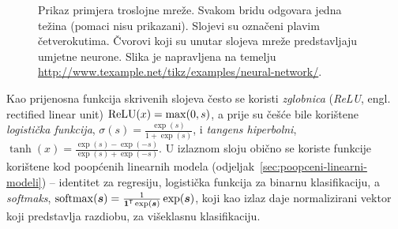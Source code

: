 \documentclass[utf8, diplomski, lmodern]{fer}
\begin{document}
\begin{figure}
\centering
{}
\caption{Prikaz primjera troslojne mreže. Svakom bridu odgovara jedna težina (pomaci nisu prikazani). Slojevi su označeni plavim četverokutima. Čvorovi koji su unutar slojeva mreže predstavljaju umjetne neurone. Slika je napravljena na temelju \url{http://www.texample.net/tikz/examples/neural-network/}.}
\label{fig:neuronska-mreza}
\end{figure}


Kao prijenosna funkcija skrivenih slojeva često se koristi \emph{zglobnica} (\emph{ReLU}, engl. rectified linear unit) $\operatorname{ReLU}(x)=\max(0, s)$, a prije su češće bile korištene \emph{logistička funkcija}, $\sigma(s)=\frac{\exp(s)}{1+\exp(s)}$, i \emph{tangens hiperbolni}, $\tanh(x)=\frac{\exp(s)-\exp(-s)}{\exp(s)+\exp(-s)}$. U izlaznom sloju obično se koriste funkcije korištene kod poopćenih linearnih modela (odjeljak~\ref{sec:poopceni-linearni-modeli}) -- identitet za regresiju, logistička funkcija za binarnu klasifikaciju, a \emph{softmaks}, $\softmax(\vec s)=\frac{1}{\cvec 1^\tp\exp(\vec s)}\exp(\vec s)$, koji kao izlaz daje normalizirani vektor koji predstavlja razdiobu, za višeklasnu klasifikaciju.
\end{document}
